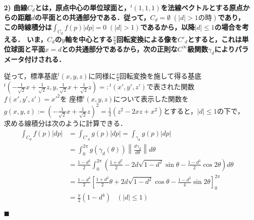 \documentclass[dvipdfmx,a4paper,uplatex]{jsarticle}
\begin{document}
\bf{2)} 曲線$C_d$とは，原点中心の単位球面と，${}^t(1,1,1)$を法線ベクトルとする原点からの距離$d$の平面との共通部分である．従って，$C_d=\emptyset\;(|d|>1の時)$であり，この時線積分は$\int_{C_d}f(p)|dp|=0\;(|d|>1)$であるから，以降$|d|\le 1$の場合を考える．
いま，$C_d$の$y$軸を中心とする$\frac{\pi}{4}$回転変換による像を$C'_d$とすると，これは単位球面と平面$x=d$との共通部分であるから，次の正則な$C^\infty$級関数$\gamma_d$によりパラメータ付けされる．
\begin{center}
\end{center}
従って，標準基底${}^t(x,y,z)$に同様に$\frac{\pi}{4}$回転変換を施して得る基底${}^t\left(-\frac{1}{\sqrt{2}}x+\frac{1}{\sqrt{2}}z,y,\frac{1}{\sqrt{2}}x+\frac{1}{\sqrt{2}}z\right)=:{}^t(x',y',z')$で表された関数$f(x',y',z')=x'^2$を
座標${}^t(x,y,z)$について表示した関数を$g(x,y,z):=\left(-\frac{1}{\sqrt{2}}x+\frac{1}{\sqrt{2}}z\right)^2=\frac{1}{2}(z^2-2xz+x^2)$とすると，$|d|\le 1$の下で，求める線積分は次のように計算できる．
\begin{align*}
    \int_{C_d}f(p)|dp| &= \int_{C'_d}g(p)|dp| = \int_{\gamma_d}g(p)|dp| \\
    &= \int^{2\pi}_0 g(\gamma_d(\theta))\left\| \frac{d\gamma_d}{d\theta} \right\|d\theta \\
    &= \frac{1-d^2}{2}\int^{2\pi}_0\left( \frac{1+d^2}{2} -2d\sqrt{1-d^2}\sin\theta - \frac{1-d^2}{2}\cos 2\theta \right)d\theta \\
    &= \frac{1-d^2}{2}\left[ \frac{1+d^2}{2}\theta + 2d\sqrt{1-d^2}\cos\theta - \frac{1-d^2}{4}\sin 2\theta \right]^{2\pi}_0 \\
    &= \frac{\pi}{2}(1-d^4)\;\;\;(|d|\le 1)
\end{align*}
\begin{flushright}
    $\blacksquare$
\end{flushright}
\clearpage
\end{document}
